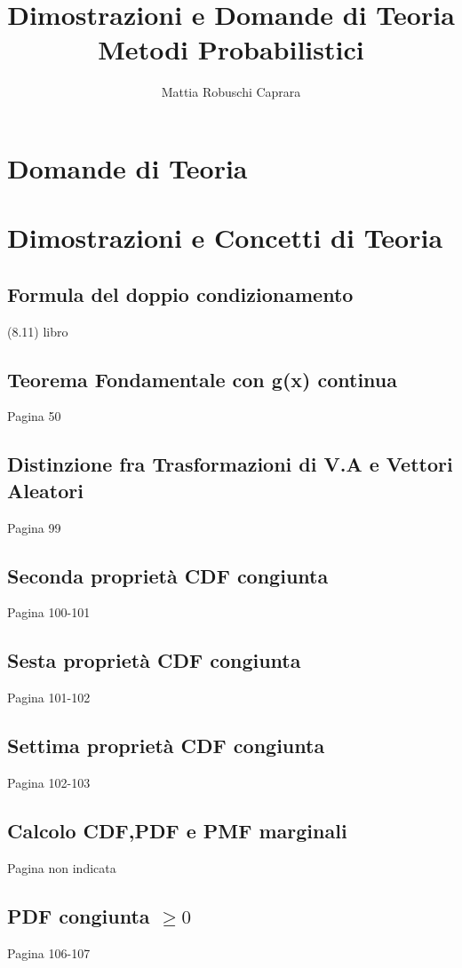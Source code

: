 \documentclass{article}
\title{Dimostrazioni e Domande di Teoria Metodi Probabilistici}
\author{Mattia Robuschi Caprara}
\date{}
\begin{document}
\maketitle

\newpage

\tableofcontents

\newpage

\section{Domande di Teoria}
\subsection{}
\section{Dimostrazioni e Concetti di Teoria}
\subsection{Formula del doppio condizionamento}
(8.11) libro
\subsection{Teorema Fondamentale con g(x) continua}
Pagina 50
\subsection{Distinzione fra Trasformazioni di V.A e Vettori Aleatori}
Pagina 99
\subsection{Seconda proprietà CDF congiunta}
Pagina 100-101
\subsection{Sesta proprietà CDF congiunta}
Pagina 101-102
\subsection{Settima proprietà CDF congiunta}
Pagina 102-103
\subsection{Calcolo CDF,PDF e PMF marginali}
Pagina non indicata
\subsection{PDF congiunta $\geq 0$}
Pagina 106-107
\end{document}
